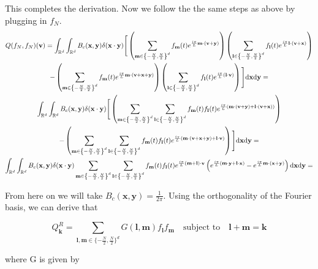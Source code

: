 \documentclass{article}
\def\t{\text}
\def\b{\mathbf}
\begin{document}
This completes the derivation. Now we follow the the same steps as above by plugging in $f_N$. 
\begin{gather*}
    Q(f_N,f_N)(\b v) = \int_{\mathbb{R}^d} \int_{\mathbb{R}^d} B_c(\b x, \b y) \delta( \b x \cdot \b y)\Bigg[ \left( \sum_{\b m \in \left\{-\frac{N}{2}, \frac{N}{2}\right\}^d} f_{\b m}(t) e^{\frac{i \pi}{L} \b m \cdot (\b v + \b y) } \right) \left( \sum_{\b l \in \left\{-\frac{N}{2}, \frac{N}{2}\right\}^d} f_{\b l}(t) e^{\frac{i \pi}{L} \b l \cdot (\b v + \b x) } \right)\\
    - \left( \sum_{\b m \in \left\{-\frac{N}{2}, \frac{N}{2}\right\}^d} f_{\b m}(t) e^{\frac{i \pi}{L} \b m \cdot (\b v + \b x + \b y) } \right) \left( \sum_{\b l \in \left\{-\frac{N}{2}, \frac{N}{2}\right\}^d} f_{\b l}(t) e^{\frac{i \pi}{L}(\b l \cdot \b v ) } \right) \Bigg] \t d \b x \t d \b y = \\
    \int_{\mathbb{R}^d} \int_{\mathbb{R}^d} B_c(\b x, \b y) \delta( \b x \cdot \b y)\Bigg[ \left( \sum_{\b m \in \left\{-\frac{N}{2}, \frac{N}{2}\right\}^d} \sum_{\b l \in \left\{-\frac{N}{2}, \frac{N}{2}\right\}^d} f_{\b m}(t) f_{\b l}(t) e^{\frac{i \pi}{L} (\b m \cdot (\b v + \b y) + \b l \cdot (\b v + \b x)) } \right)\\
    - \left( \sum_{\b m \in \left\{-\frac{N}{2}, \frac{N}{2}\right\}^d} \sum_{\b l \in \left\{-\frac{N}{2}, \frac{N}{2}\right\}^d} f_{\b m}(t) f_{\b l}(t) e^{\frac{i \pi}{L} (\b m \cdot (\b v + \b x + \b y) + \b l \cdot \b v) } \right) \Bigg] \t d \b x \t d \b y = \\
    \int_{\mathbb{R}^d} \int_{\mathbb{R}^d} B_c(\b x, \b y) \delta( \b x \cdot \b y) \sum_{\b m \in \left\{-\frac{N}{2}, \frac{N}{2}\right\}^d} \sum_{\b l \in \left\{-\frac{N}{2}, \frac{N}{2}\right\}^d} f_{\b m}(t) f_{\b l}(t) e^{\frac{i \pi}{L} (\b m + \b l) \cdot \b v} \left( e^{\frac{i \pi}{L} (\b m \cdot \b y + \b l \cdot \b x) } - e^{\frac{i \pi}{L} \b m \cdot (\b x + \b y) }\right) \t d \b x \t d \b y = 
\end{gather*}

From here on we will take $B_c(\b x, \b y) = \frac{1}{2 \pi}$. Using the orthogonality of the Fourier basis, we can derive that

\begin{equation} \label{eq:QR_carl}
    Q^R_{\b k} = \sum_{\b l,\b m \in \{-\frac{N}{2}, \frac{N}{2}\}^d} G(\b l,\b m) f_{\b l} f_{\b m} \quad \text{subject to} \quad \b l + \b m = \b k
\end{equation}

where G is given by
\end{document}
